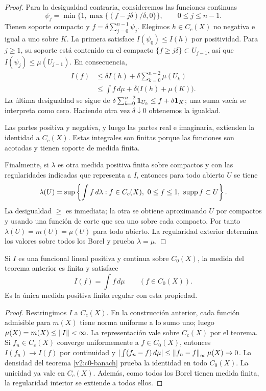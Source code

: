 \begin{proof}
Para la desigualdad contraria, consideremos las funciones continuas
\[
 \psi_j=\min\{1,\max\{(f-j\delta)/\delta,0\}\},\qquad 0\le j\le n-1.
\]
Tienen soporte compacto y $f=\delta\sum_{j=0}^{n-1}\psi_j$. Elegimos $h\in C_c(X)$ no negativa e igual a uno sobre $K$. La primera satisface $I(\psi_0)\le I(h)$ por positividad. Para $j\ge1$, su soporte está contenido en el compacto $\{f\ge j\delta\}\subset U_{j-1}$, así que $I(\psi_j)\le\mu(U_{j-1})$. En consecuencia,
\begin{align*}
 I(f)&\le\delta I(h)+\delta\sum_{k=0}^{n-2}\mu(U_k)\\
 &\le\int f\,d\mu+\delta\bigl(I(h)+\mu(K)\bigr).
\end{align*}
La última desigualdad se sigue de $\delta\sum_{k=0}^{n-2}\mathbf1_{U_k}\le f+\delta\mathbf1_{K}$; una suma vacía se interpreta como cero. Haciendo otra vez $\delta\downarrow0$ obtenemos la igualdad.

Las partes positiva y negativa, y luego las partes real e imaginaria, extienden la identidad a $C_c(X)$. Estas integrales son finitas porque las funciones son acotadas y tienen soporte de medida finita.

Finalmente, si $\lambda$ es otra medida positiva finita sobre compactos y con las regularidades indicadas que representa a $I$, entonces para todo abierto $U$ se tiene
\[
 \lambda(U)=\sup\left\{\int f\,d\lambda:f\in C_c(X),\ 0\le f\le1,\ \operatorname{supp} f\subset U\right\}.
\]
La desigualdad $\ge$ es inmediata; la otra se obtiene aproximando $U$ por compactos y usando una función de corte que sea uno sobre cada compacto. Por tanto $\lambda(U)=m(U)=\mu(U)$ para todo abierto. La regularidad exterior determina los valores sobre todos los Borel y prueba $\lambda=\mu$.
\end{proof}

\begin{corolario}\label{v2:riesz-positivo}
Si $I$ es una funcional lineal positiva y continua sobre $C_0(X)$, la medida del teorema anterior es finita y satisface
\[
 I(f)=\int f\,d\mu\qquad(f\in C_0(X)).
\]
Es la única medida positiva finita regular con esta propiedad.
\end{corolario}
\begin{proof}
Restringimos $I$ a $C_c(X)$. En la construcción anterior, cada función admisible para $m(X)$ tiene norma uniforme a lo sumo uno; luego $\mu(X)=m(X)\le\left\lVert I\right\rVert<\infty$. La representación vale sobre $C_c(X)$ por el teorema. Si $f_n\in C_c(X)$ converge uniformemente a $f\in C_0(X)$, entonces $I(f_n)\to I(f)$ por continuidad y
$|\int(f_n-f)\,d\mu|\le\left\lVert f_n-f\right\rVert_\infty\mu(X)\to0$. La densidad del teorema \ref{v2:c0-banach} prueba la identidad en todo $C_0(X)$. La unicidad ya vale en $C_c(X)$. Además, como todos los Borel tienen medida finita, la regularidad interior se extiende a todos ellos.
\end{proof}

